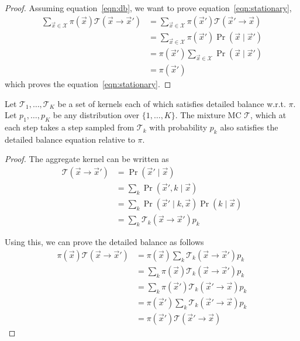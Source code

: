\begin{proof}
    Assuming equation~\eqref{eqn:db}, we want to prove equation~\eqref{eqn:stationary},
    \begin{align}
        \sum_{\vec x \in \mathcal X} \pi(\vec x)\mathcal T(\vec x \to \vec x')  &= \sum_{\vec x \in \mathcal X} \pi(\vec x')\mathcal T(\vec x' \to \vec x) \\
                                                                                &= \sum_{\vec x \in \mathcal X} \pi(\vec x') \Pr(\vec x \mid \vec x') \\
                                                                                &= \pi(\vec x') \sum_{\vec x \in \mathcal X} \Pr(\vec x \mid \vec x') \\
                                                                                &= \pi(\vec x')
    \end{align}
    which proves the equation~\eqref{eqn:stationary}.
\end{proof}

\begin{proposition}
    Let $\mathcal T_1, \dotsc, \mathcal T_K$ be a set of kernels each of which satisfies detailed balance w.r.t. $\pi$. Let $p_1, \dotsc, p_K$ be any distribution over $\{1, \dotsc, K\}$. The mixture MC $\mathcal T$, which at each step takes a step sampled from $\mathcal T_k$ with probability $p_k$ also satisfies the detailed balance equation relative to $\pi$.
\end{proposition}

\begin{proof}
    The aggregate kernel can be written as
    \begin{align}
        \mathcal T(\vec x \to \vec x')  &= \Pr(\vec x' \mid \vec x) \\
                                        &= \sum_k \Pr(\vec x', k \mid \vec x) \\
                                        &= \sum_k \Pr(\vec x' \mid k, \vec x) \Pr(k \mid \vec x) \\
                                        &= \sum_k \mathcal T_k(\vec x \to \vec x') p_k
    \end{align}

    Using this, we can prove the detailed balance as follows
    \begin{align}
        \pi(\vec x)\mathcal T(\vec x \to \vec x')   &= \pi(\vec x) \sum_k \mathcal T_k(\vec x \to \vec x') p_k \\
                                                    &= \sum_k \pi(\vec x) \mathcal T_k(\vec x \to \vec x') p_k \\
                                                    &= \sum_k \pi(\vec x') \mathcal T_k(\vec x' \to \vec x) p_k \\
                                                    &= \pi(\vec x') \sum_k \mathcal T_k(\vec x' \to \vec x) p_k \\
                                                    &= \pi(\vec x') \mathcal T(\vec x' \to \vec x)
    \end{align}
\end{proof}

